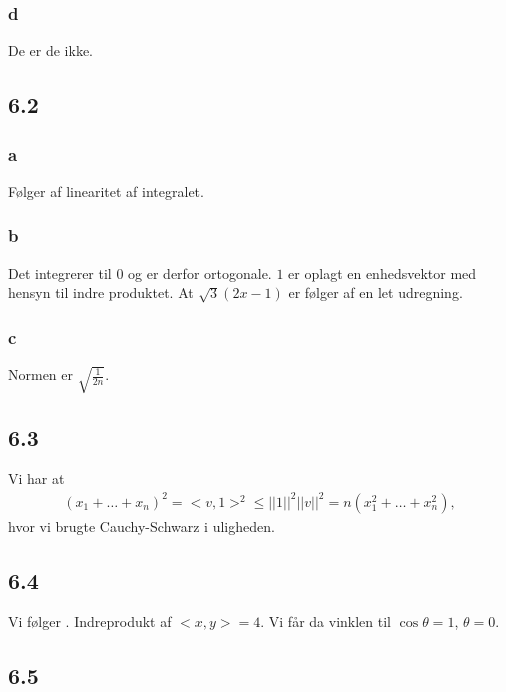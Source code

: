 			\subsubsection{d}

				De er de ikke.

		\subsection{6.2}

			\subsubsection{a}

				Følger af linearitet af integralet.

			\subsubsection{b}

				Det integrerer til $0$ og er derfor ortogonale. $1$ er oplagt en enhedsvektor med hensyn til indre produktet. At $\sqrt{3}(2x-1)$ er følger af en let udregning. 

			\subsubsection{c}

				Normen er $\sqrt{\frac{1}{2n}}$.

		\subsection{6.3}

			Vi har at 
				\begin{align*}
					(x_1+\ldots+x_n)^2=<v,1>^2\leq ||1||^2||v||^2=n(x_1^2+\ldots+x_n^2),
				\end{align*} 
			hvor vi brugte Cauchy-Schwarz i uligheden.

		\subsection{6.4}

			Vi følger \cite[Eksempel 6.1.6]{hesselholt2017}. Indreprodukt af $<x,y>=4$. Vi får da vinklen til $\cos \theta =1$, $\theta =0$.

		\subsection{6.5}

